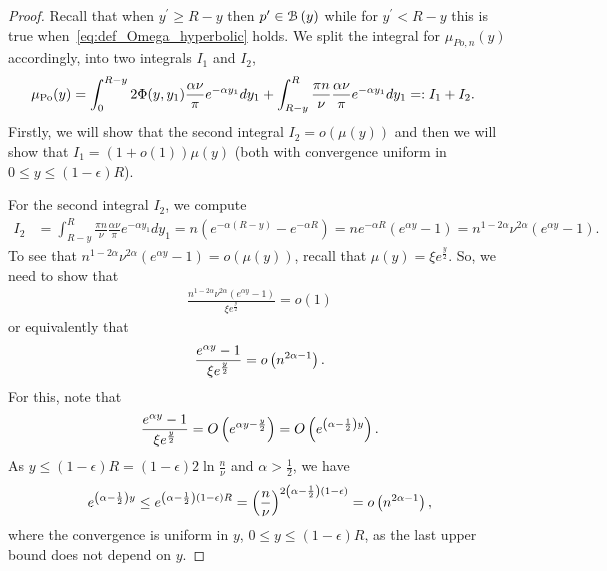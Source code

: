 \begin{proof}
Recall that when $y^\prime \ge R - y$ then $p^\prime \in {\mathcal B}\left(y\right)$ while for $y^\prime < R - y$ this is true when~\eqref{eq:def_Omega_hyperbolic} holds. We split the integral for $\mu_{Po,n}(y)$ accordingly, into two integrals $I_1$ and $I_2$,
\begin{align*}
\mu_{{\mathrm{Po}}}(y) 
&= \int_0^{R-y} 2\Phi(y,y_1)\frac{\alpha\nu}{\pi}e^{-\alpha y_1} dy_1+\int_{R-y}^R \frac{\pi n}{\nu} \frac{\alpha \nu}{\pi}e^{-\alpha y_1}dy_1 =: I_1+I_2.
\end{align*}
Firstly, we will show that the second integral $I_2=o(\mu(y))$ and then we will show that $I_1 = (1+o(1))\mu(y)$ (both with  convergence uniform in $0\leq y\leq (1-\epsilon)R$).

For the second integral $I_2$, we compute
\begin{align*}
I_2 &= \int_{R-y}^R \frac{\pi n}{\nu} \frac{\alpha \nu}{\pi}e^{-\alpha y_1}dy_1 =n(e^{-\alpha(R-y)}-e^{-\alpha R}) =ne^{-\alpha R}(e^{\alpha y} -1) =n^{1-2\alpha}\nu^{2\alpha}(e^{\alpha y} -1). 	%
\end{align*}
To see that $n^{1-2\alpha}\nu^{2\alpha}(e^{\alpha y} -1) = o(\mu(y))$, recall that $\mu(y)=\xi e^{\frac{y}{2}}$. So, we need to show that
\begin{align*}
\frac{n^{1-2\alpha}\nu^{2\alpha}(e^{\alpha y} -1)}{\xi e^{\frac{y}{2}}} = o(1)
\end{align*}
or equivalently that
\begin{align*}
\frac{e^{\alpha y}-1}{\xi e^{\frac{y}{2}}}=o\left(n^{2\alpha-1}\right).
\end{align*}
For this, note that
\begin{align*}
\frac{e^{\alpha y}-1}{\xi e^{\frac{y}{2}}}=O\left(e^{\alpha y-\frac{y}{2}}\right) = O\left(e^{\left(\alpha-\frac{1}{2}\right)y}\right).
\end{align*}
As $y \leq (1-\epsilon)R =(1-\epsilon)2\ln \frac{n}{\nu}$ and $\alpha > \frac{1}{2}$, we have 
\[
	e^{\left(\alpha-\frac{1}{2}\right)y} \leq e^{\left(\alpha-\frac{1}{2}\right)(1-\epsilon)R} = \left(\frac{n}{\nu}\right)^{2\left(\alpha-\frac{1}{2}\right)(1-\epsilon)} = o\left(n^{2\alpha-1}\right),
\]
where the convergence is uniform in $y$, $0\leq y\leq (1-\epsilon)R$, as the last upper bound does not depend on $y$.


\end{proof}
